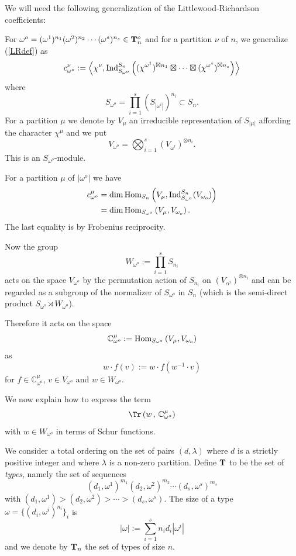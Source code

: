 We will need the following generalization of the Littlewood-Richardson coefficients:

For $\omega^o=(\omega^1)^{n_1}(\omega^2)^{n_2}\cdots(\omega^s)^{n_s}\in{\bf T}^o_n$ and for a partition $\nu$ of $n$, we generalize (\ref{LRdef}) as 
$$
c_{\omega^o}^\nu:=\left\langle \chi^\nu,{\rm Ind}_{S_{\omega^o}}^{S_n}\left((\chi^{\omega^1})^{\boxtimes n_1}\boxtimes\cdots\boxtimes(\chi^{\omega^s})^{\boxtimes n_s}\right)\right\rangle
$$
where 
$$
S_{\omega^o}=\prod_{i=1}^s(S_{|\omega^i|})^{n_i}\subset S_n.
$$
For a partition $\mu$ we denote by $V_\mu$ an irreducible representation of $S_{|\mu|}$ affording the character $\chi^\mu$ and we put
$$
V_{\omega^o}=\bigotimes _{i=1}^s (V_{\omega^i})^{\otimes n_i}.
$$
This is an $S_{\omega^o}$-module. 

For a partition $\mu$ of $|\omega^o|$ we have
\begin{align*}
	c_{\omega^o}^\mu&={\rm dim}\,{\rm Hom}_{S_n}\left(V_\mu,{\rm Ind}_{S_{\omega^o}}^{S_n}(V_{\omega_o})\right)\\
	&={\rm dim}\,{\rm Hom}_{S_{\omega^o}}\left(V_\mu,V_{\omega_o}\right).
\end{align*}
The last equality is by Frobenius reciprocity.

Now the group 
$$
W_{\omega^o}:=\prod_{i=1}^s S_{n_i}
$$
acts on the space $V_{\omega^o}$ by the permutation action of $S_{n_i}$ on $(V_{\alpha^i})^{\otimes n_i}$ and can be regarded as a subgroup of the normalizer of $S_{\omega^o}$ in $S_n$ (which is the semi-direct product $S_{\omega^o}\rtimes W_{\omega^o}$). 

Therefore it acts on the space
$$
\mathbb{C}_{\omega^o}^\mu:={\rm Hom}_{S_{\omega^o}}\left(V_\mu,V_{\omega_o}\right)
$$ 
as
$$
w\cdot f(v):=w\cdot f(w^{-1}\cdot v)
$$
for $f\in\mathbb{C}_{\omega^o}^\mu$, $v\in V_{\omega^o}$ and $w\in W_{\omega^o}$.


We now explain how to express the term
$$
\Tr\left(w\,,\, \mathbb{C}_{\omega^o}^\mu\right)
$$
with $w\in W_{\omega^o}$ in terms of Schur functions.


We consider a total ordering on the set of pairs $(d,\lambda)$ where $d$ is a strictly positive integer and where $\lambda$ is a non-zero partition. Define ${\bf T}$ to be the set of \emph{types}, namely the set of sequences
$$
(d_1,\omega^1)^{m_1}(d_2,\omega^2)^{m_2}\cdots(d_s,\omega^s)^{m_s}
$$
with $(d_1,\omega^1)>(d_2,\omega^2)>\cdots>(d_s,\omega^s)$. The size of a type $\omega=\{(d_i,\omega^i)^{n_i}\}_i$ is
$$
|\omega|:=\sum_{i=1}^sn_id_i|\omega^i|
$$
and we denote by ${\bf T}_n$ the set of types of size $n$.



